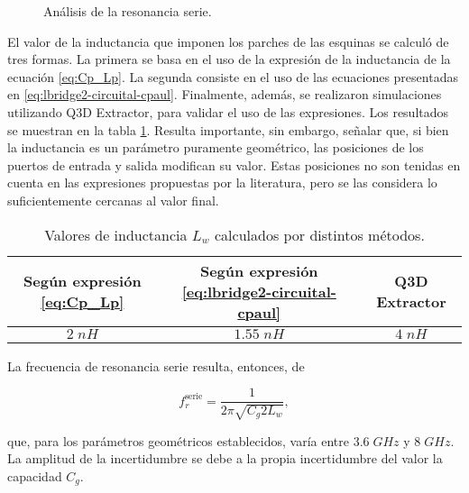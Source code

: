 \begin{figure}[H]
	\centering 
	\hspace{0pt}
	\caption{Análisis de la resonancia serie.}
	\label{fig:p13-p14-sdf}
\end{figure}

El valor de la inductancia que imponen los parches de las esquinas se calculó de tres formas. La primera se basa en el uso de la expresión de la inductancia de la ecuación \ref{eq:Cp_Lp}. La segunda consiste en el uso de las ecuaciones presentadas en \ref{eq:lbridge2-circuital-cpaul}. Finalmente, además, se realizaron simulaciones utilizando Q3D Extractor, para validar el uso de las expresiones. Los resultados se muestran en la tabla \ref{table:lw}. Resulta importante, sin embargo, señalar que, si bien la inductancia es un parámetro puramente geométrico, las posiciones de los puertos de entrada y salida modifican su valor. Estas posiciones no son tenidas en cuenta en las expresiones propuestas por la literatura, pero se las considera lo suficientemente cercanas al valor final.

\begin{table}
	\centering
	\begin{tabular}{|c|c|c|}
		\hline 
		Según expresión \ref{eq:Cp_Lp} & Según expresión \ref{eq:lbridge2-circuital-cpaul} & Q3D Extractor \\ 
		\hline 
		$2\;nH$ & $1.55\;nH$ & $4\;nH$\\ 
		\hline 
	\end{tabular}
	\caption{Valores de inductancia $L_w$ calculados por distintos métodos.}
	\label{table:lw}
\end{table}

La frecuencia de resonancia serie resulta, entonces, de

\begin{equation}
	f_r^{\text{serie}} = \frac{1}{2\pi \sqrt{C_g 2 L_w}},
\end{equation}

que, para los parámetros geométricos establecidos, varía entre $3.6\;GHz$ y $8\;GHz$. La amplitud de la incertidumbre se debe a la propia incertidumbre del valor la capacidad $C_g$.

